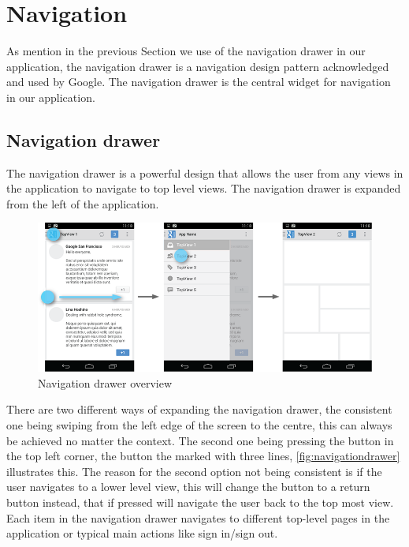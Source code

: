 \section{Navigation}\label{sec:navigation}
As mention in the previous Section we use of the navigation drawer in our application, the navigation drawer is a navigation design pattern acknowledged and used by Google.\cite{guidelines-navigationdrawer} The navigation drawer is the central widget for navigation in our application.
 
\subsection{Navigation drawer}
The navigation drawer is a powerful design that allows the user from any views in the application to navigate to top level views. The navigation drawer is expanded from the left of the application.
\begin{figure}[H]
\centering
\includegraphics[width=0.9\linewidth]{img/screenshots/navigation_drawer_overview.png}
\caption{Navigation drawer overview \cite{guidelines-navigationdrawer}}
\label{fig:navigationdrawer}
\end{figure}
There are two different ways of expanding the navigation drawer, the consistent one being swiping from the left edge of the screen to the centre, this can always be achieved no matter the context. 
The second one being pressing the button in the top left corner, the button the marked with three lines, \autoref{fig:navigationdrawer} illustrates this. 
The reason for the second option not being consistent is if the user navigates to a lower level view, this will change the button to a return button instead, that if pressed will navigate the user back to the top most view. 
Each item in the navigation drawer navigates to different top-level pages in the application or typical main actions like sign in/sign out.

